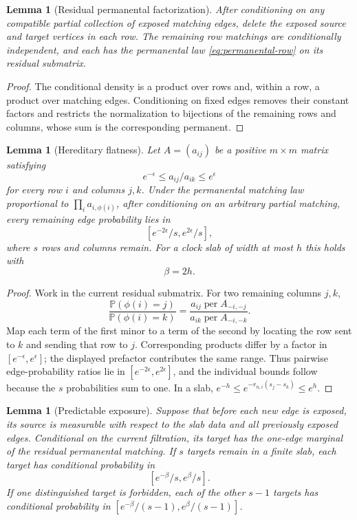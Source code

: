\documentclass[11pt]{article}
\newtheorem{lemma}[theorem]{Lemma}
\theoremstyle{definition}
\theoremstyle{remark}
\newcommand{\Pp}{\mathbb P}
\begin{document}
\begin{lemma}[Residual permanental factorization]
\label{lem:residual-factorization}
After conditioning on any compatible partial collection of exposed matching
edges, delete the exposed source and target vertices in each row.  The remaining
row matchings are conditionally independent, and each has the permanental law
\eqref{eq:permanental-row} on its residual submatrix.
\end{lemma}

\begin{proof}
The conditional density is a product over rows and, within a row, a product
over matching edges.  Conditioning on fixed edges removes their constant
factors and restricts the normalization to bijections of the remaining rows and
columns, whose sum is the corresponding permanent.
\end{proof}

\begin{lemma}[Hereditary flatness]
\label{lem:flatness}
Let $A=(a_{ij})$ be a positive $m\times m$ matrix satisfying
\[
 e^{-\epsilon}\le a_{ij}/a_{ik}\le e^\epsilon
\]
for every row $i$ and columns $j,k$.  Under the permanental matching law
proportional to $\prod_i a_{i,\phi(i)}$, after conditioning on an arbitrary
partial matching, every remaining edge probability lies in
\[
  [e^{-2\epsilon}/s,e^{2\epsilon}/s],
\]
where $s$ rows and columns remain.  For a clock slab of width at most $h$ this
holds with
\begin{equation}
  \beta=2h.
  \label{eq:beta}
\end{equation}
\end{lemma}

\begin{proof}
Work in the current residual submatrix.  For two remaining columns $j,k$,
\[
 \frac{\Pp(\phi(i)=j)}{\Pp(\phi(i)=k)}
 =\frac{a_{ij}\operatorname{per}A_{-i,-j}}
       {a_{ik}\operatorname{per}A_{-i,-k}}.
\]
Map each term of the first minor to a term of the second by locating the row
sent to $k$ and sending that row to $j$.  Corresponding products differ by a
factor in $[e^{-\epsilon},e^\epsilon]$; the displayed prefactor contributes the
same range.  Thus pairwise edge-probability ratios lie in
$[e^{-2\epsilon},e^{2\epsilon}]$, and the individual bounds follow because the
$s$ probabilities sum to one.  In a slab,
$e^{-h}\le e^{-r_{n,i}(s_j-s_k)}\le e^h$.
\end{proof}

\begin{lemma}[Predictable exposure]
\label{lem:predictable-exposure}
Suppose that before each new edge is exposed, its source is measurable with
respect to the slab data and all previously exposed edges.  Conditional on the
current filtration, its target has the one-edge marginal of the residual
permanental matching.  If $s$ targets remain in a finite slab, each target has
conditional probability in
\[
  [e^{-\beta}/s,e^\beta/s].
\]
If one distinguished target is forbidden, each of the other $s-1$ targets has
conditional probability in
$[e^{-\beta}/(s-1),e^\beta/(s-1)]$.
\end{lemma}
\end{document}
